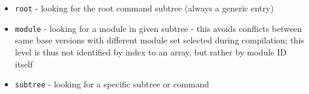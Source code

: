 \begin{itemize}
	\item \texttt{root} - looking for the root command subtree (always a generic entry)
	\item \texttt{module} - looking for a module in given subtree - this avoids conflicts between same base versions with different module set selected during compilation; this level is thus not identified by index to an array, but rather by module ID itself
	\item \texttt{subtree} - looking for a specific subtree or command
\end{itemize}


